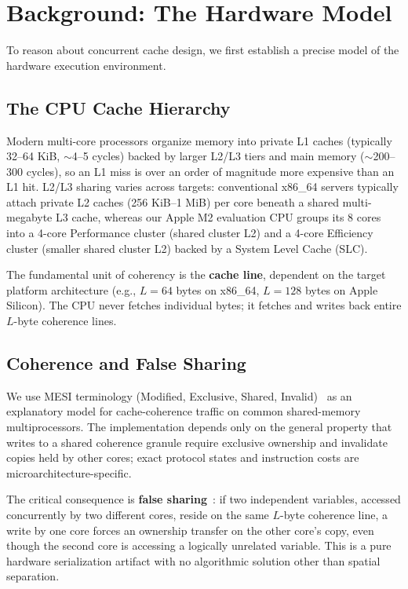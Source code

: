 \documentclass[11pt,a4paper]{article}
\begin{document}
\section{Background: The Hardware Model}

To reason about concurrent cache design, we first establish a precise model of the hardware execution environment.

\subsection{The CPU Cache Hierarchy}

Modern multi-core processors organize memory into private L1 caches (typically 32--64 KiB, $\sim$4--5 cycles) backed by larger L2/L3 tiers and main memory ($\sim$200--300 cycles), so an L1 miss is over an order of magnitude more expensive than an L1 hit. L2/L3 sharing varies across targets: conventional x86\_64 servers typically attach private L2 caches (256 KiB--1 MiB) per core beneath a shared multi-megabyte L3 cache, whereas our Apple M2 evaluation CPU groups its 8 cores into a 4-core Performance cluster (shared cluster L2) and a 4-core Efficiency cluster (smaller shared cluster L2) backed by a System Level Cache (SLC).

The fundamental unit of coherency is the \textbf{cache line}, dependent on the target platform architecture (e.g., $L=64$ bytes on x86\_64, $L=128$ bytes on Apple Silicon). The CPU never fetches individual bytes; it fetches and writes back entire $L$-byte coherence lines.

\subsection{Coherence and False Sharing}

We use MESI terminology (Modified, Exclusive, Shared, Invalid)~\cite{mesi1984} as an explanatory model for cache-coherence traffic on common shared-memory multiprocessors. The implementation depends only on the general property that writes to a shared coherence granule require exclusive ownership and invalidate copies held by other cores; exact protocol states and instruction costs are microarchitecture-specific.

The critical consequence is \textbf{false sharing}~\cite{falsesharing1993}: if two independent variables, accessed concurrently by two different cores, reside on the same $L$-byte coherence line, a write by one core forces an ownership transfer on the other core's copy, even though the second core is accessing a logically unrelated variable. This is a pure hardware serialization artifact with no algorithmic solution other than spatial separation.
\end{document}
